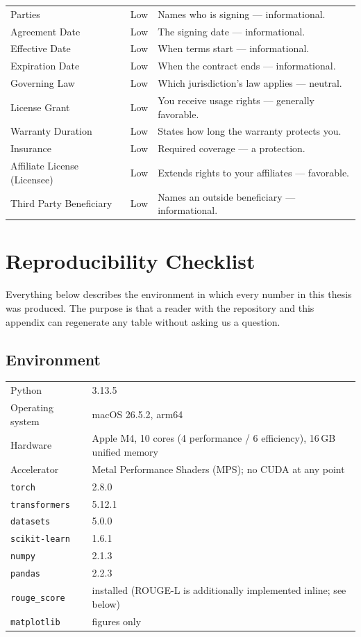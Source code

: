 \begin{longtable}{p{4.6cm} c p{7.6cm}}
Parties & \textcolor{risklow}{Low} & Names who is signing --- informational.\\
Agreement Date & \textcolor{risklow}{Low} & The signing date --- informational.\\
Effective Date & \textcolor{risklow}{Low} & When terms start --- informational.\\
Expiration Date & \textcolor{risklow}{Low} & When the contract ends --- informational.\\
Governing Law & \textcolor{risklow}{Low} & Which jurisdiction's law applies --- neutral.\\
License Grant & \textcolor{risklow}{Low} & You receive usage rights --- generally favorable.\\
Warranty Duration & \textcolor{risklow}{Low} & States how long the warranty protects you.\\
Insurance & \textcolor{risklow}{Low} & Required coverage --- a protection.\\
Affiliate License (Licensee) & \textcolor{risklow}{Low} & Extends rights to your affiliates --- favorable.\\
Third Party Beneficiary & \textcolor{risklow}{Low} & Names an outside beneficiary --- informational.\\
\bottomrule
\end{longtable}

\chapter{Reproducibility Checklist}
\label{app:repro}

Everything below describes the environment in which every number in this thesis was produced. The purpose is that a reader with the repository and this appendix can regenerate any table without asking us a question.

\section*{Environment}
\begin{tabular}{p{4.5cm} p{9cm}}
\toprule
Python & 3.13.5\\
Operating system & macOS 26.5.2, arm64\\
Hardware & Apple M4, 10 cores (4 performance / 6 efficiency), 16\,GB unified memory\\
Accelerator & Metal Performance Shaders (MPS); no CUDA at any point\\
\midrule
\texttt{torch} & 2.8.0\\
\texttt{transformers} & 5.12.1\\
\texttt{datasets} & 5.0.0\\
\texttt{scikit-learn} & 1.6.1\\
\texttt{numpy} & 2.1.3\\
\texttt{pandas} & 2.2.3\\
\texttt{rouge\_score} & installed (ROUGE-L is additionally implemented inline; see below)\\
\texttt{matplotlib} & figures only\\
\bottomrule
\end{tabular}

